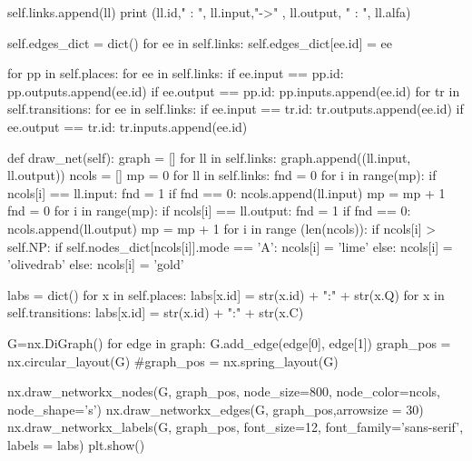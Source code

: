 \begin{python}
            self.links.append(ll)
            print (ll.id," : ", ll.input,"->" , ll.output, " : ", ll.alfa)
        
        self.edges_dict = dict()
        for ee in self.links:
            self.edges_dict[ee.id] = ee
        
        for pp in self.places:
            for ee in self.links:
                if ee.input == pp.id:
                    pp.outputs.append(ee.id)
                if ee.output == pp.id:
                    pp.inputs.append(ee.id)
        for tr in self.transitions:
            for ee in self.links:
                if ee.input == tr.id:
                    tr.outputs.append(ee.id)
                if ee.output == tr.id:
                    tr.inputs.append(ee.id)
    
    
    def draw_net(self):
        graph = []
        for ll in self.links:
            graph.append((ll.input, ll.output))
        ncols = []
        mp = 0
        for ll in self.links:
            fnd = 0
            for i in range(mp):
                if ncols[i] == ll.input:
                    fnd = 1
            if fnd == 0:
                ncols.append(ll.input)
                mp = mp + 1
            fnd = 0
            for i in range(mp):
                if ncols[i] == ll.output:
                    fnd = 1
            if fnd == 0:
                ncols.append(ll.output)
                mp = mp + 1
        for i in range (len(ncols)):
            if ncols[i] > self.NP:
                if self.nodes_dict[ncols[i]].mode == 'A':
                    ncols[i] = 'lime'
                else:
                    ncols[i] = 'olivedrab'
            else:
                ncols[i] = 'gold'
            
        labs = dict()
        for x in self.places:
            labs[x.id] = str(x.id) + ":" + str(x.Q)
        for x in self.transitions:
            labs[x.id] = str(x.id) + ":" + str(x.C)

        G=nx.DiGraph()
        for edge in graph:
            G.add_edge(edge[0], edge[1])
        graph_pos = nx.circular_layout(G)
        #graph_pos = nx.spring_layout(G)
    
        nx.draw_networkx_nodes(G, graph_pos,
            node_size=800,
            node_color=ncols,
            node_shape='s')
        nx.draw_networkx_edges(G, graph_pos,arrowsize = 30)
        nx.draw_networkx_labels(G, graph_pos,
            font_size=12,
            font_family='sans-serif',
            labels = labs)
        plt.show()


\end{python}
